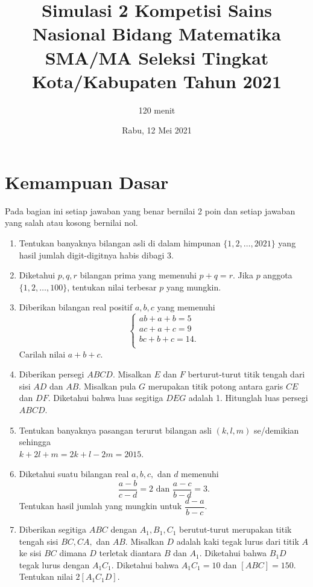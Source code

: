 \documentclass[12pt]{extarticle}
\title{Simulasi 2 Kompetisi Sains Nasional Bidang Matematika SMA/MA Seleksi Tingkat Kota/Kabupaten Tahun 2021}
\author{120 menit}
\date{Rabu, 12 Mei 2021}
\begin{document}
	\maketitle
	
	\section{Kemampuan Dasar}
	Pada bagian ini setiap jawaban yang benar bernilai 2 poin dan setiap jawaban yang salah
	atau kosong bernilai nol.
	\begin{enumerate}
		\item Tentukan banyaknya bilangan asli di dalam himpunan $\{1,2,\dots,2021\}$ yang hasil jumlah digit-digitnya habis dibagi 3.
		
		\item Diketahui $p,q,r$ bilangan prima yang memenuhi $p+q=r$. Jika $p$ anggota $\{1,2,\dots,100\}$, tentukan nilai terbesar $p$ yang mungkin.
		
		\item Diberikan bilangan real positif $a,b,c$ yang memenuhi \begin{equation*}
			\begin{cases}
				ab+a+b=5 \\
				ac+a+c=9 \\
				bc+b+c=14. \\
			\end{cases}
		\end{equation*}
		Carilah nilai $a+b+c$.
		
		\item Diberikan persegi $ABCD$. Misalkan $E$ dan $F$ berturut-turut titik tengah dari sisi $AD$ dan $AB$. Misalkan pula $G$ merupakan titik potong antara garis $CE$ dan $DF$. Diketahui bahwa luas segitiga $DEG$ adalah 1. Hitunglah luas persegi $ABCD$.
		
		\item Tentukan banyaknya pasangan terurut bilangan asli $(k,l,m)$ se/demikian sehingga \\ $k+2l+m=2k+l-2m=2015$.
		
		\item Diketahui suatu bilangan real $a,b,c,$ dan $d$ memenuhi $$\frac{a-b}{c-d}=2 \text{ dan } \frac{a-c}{b-d}=3.$$ Tentukan hasil jumlah yang mungkin untuk $\dfrac{d-a}{b-c}$.
		
		\item Diberikan segitiga $ABC$ dengan $A_1,B_1,C_1$ berutut-turut merupakan titik tengah sisi $BC,CA,$ dan $AB$. Misalkan $D$ adalah kaki tegak lurus dari titik $A$ ke sisi $BC$ dimana $D$ terletak diantara $B$ dan $A_1$. Diketahui bahwa $B_1D$ tegak lurus dengan $A_1C_1$. Diketahui bahwa $A_1C_1 = 10$ dan $[ABC] = 150$. Tentukan nilai $2[A_1C_1D]$.
		

\end{enumerate}
\end{document}
